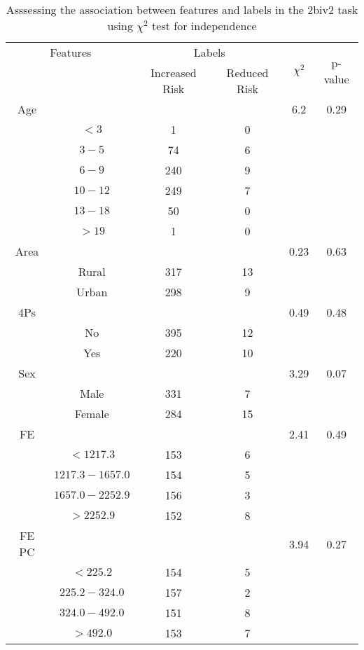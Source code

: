 \begin{table}[!htb]
\centering
\caption{Asssessing the association between features and labels in the 2biv2 task using $\chi^2$ test for independence}
\label{tab:chitest_2biv2}
\begin{tabular}{c c | c c| c | c}
\hline
\multicolumn{2}{c|}{Features}& \multicolumn{2}{c|}{Labels}& \multirow{2}{*}{$\chi^2$} & \multirow{2}{*}{p-value}\\ 
& & Increased Risk & Reduced Risk & & \\ 
\hline
Age &  &  & & 6.2 & 0.29 \\ 
& $< 3$ & 1 & 0& & \\ 
& $3-5$ & 74 & 6& & \\ 
& $6-9$ & 240 & 9& & \\ 
& $10-12$ & 249 & 7& & \\ 
& $13-18$ & 50 & 0& & \\ 
& $> 19$ & 1 & 0& & \\ 
\hline 
Area &  &  & & 0.23 & 0.63 \\ 
& Rural & 317 & 13& & \\ 
& Urban & 298 & 9& & \\ 
\hline 
4Ps &  &  & & 0.49 & 0.48 \\ 
& No & 395 & 12& & \\ 
& Yes & 220 & 10& & \\ 
\hline 
Sex &  &  & & 3.29 & 0.07 \\ 
& Male & 331 & 7& & \\ 
& Female & 284 & 15& & \\ 
\hline 
FE &  &  & & 2.41 & 0.49 \\ 
& $< 1217.3$ & 153 & 6& & \\ 
& $1217.3-1657.0$ & 154 & 5& & \\ 
& $1657.0-2252.9$ & 156 & 3& & \\ 
& $> 2252.9$ & 152 & 8& & \\ 
\hline 
FE PC &  &  & & 3.94 & 0.27 \\ 
& $< 225.2$ & 154 & 5& & \\ 
& $225.2-324.0$ & 157 & 2& & \\ 
& $324.0-492.0$ & 151 & 8& & \\ 
& $> 492.0$ & 153 & 7& & \\ 
\hline 
\end{tabular}
\end{table}
